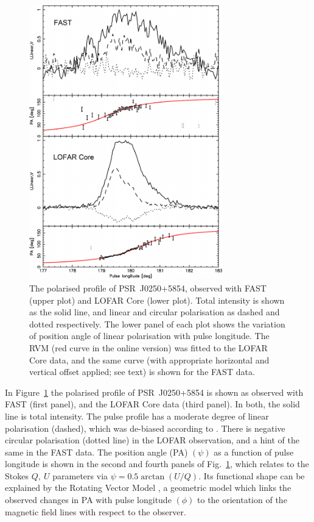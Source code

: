 \begin{figure}
    \begin{center}
        \includegraphics[width=0.75\textwidth]{Figures/J0250/polarised_profiles}
        \caption[The polarised FAST and LOFAR Core profiles of PSR~J0250+5854]{The polarised profile of PSR~J0250+5854, observed with FAST (upper plot) and LOFAR Core (lower plot). Total intensity is shown as the solid line, and linear and circular polarisation as dashed and dotted respectively. The lower panel of each plot shows the variation of position angle of linear polarisation with pulse longitude. The RVM (red curve in the online version) was fitted to the LOFAR Core data, and the same curve (with appropriate horizontal and vertical offset applied; see text) is shown for the FAST data.}
        \label{fig: J0250 - polarised profiles}
    \end{center}
\end{figure}
   
In Figure~\ref{fig: J0250 - polarised profiles} the polarised profile of PSR~J0250+5854 is shown as observed with FAST (first panel), and the LOFAR Core data (third panel). In both, the solid line is total intensity. The pulse profile has a moderate degree of linear polarisation (dashed), which was de-biased according to \citet{WKxx1974}. There is negative circular polarisation (dotted line) in the LOFAR observation, and a hint of the same in the FAST data. The position angle (PA) $(\psi)$ as a function of pulse longitude is shown in the second and fourth panels of Fig.~\ref{fig: J0250 - polarised profiles}, which relates to the Stokes $Q,\ U$ parameters via $\psi = 0.5 \arctan(U/Q)$. Its functional shape can be explained by the Rotating Vector Model \citep[RVM;][]{RCxx1969}, a geometric model which links the observed changes in PA with pulse longitude $(\phi)$ to the orientation of the magnetic field lines with respect to the observer.

